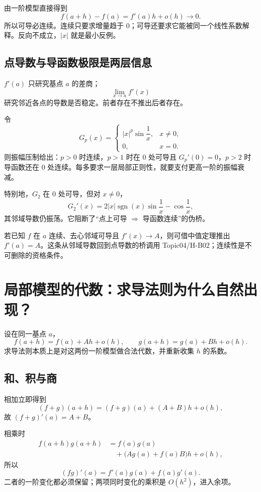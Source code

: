 \documentclass[11pt,a4paper]{ctexart}
\begin{document}
由一阶模型直接得到
\[
f(a+h)-f(a)=f'(a)h+o(h)\to0.
\]
所以可导必连续。连续只要求增量趋于 $0$；可导还要求它能被同一个线性系数解释。反向不成立，$|x|$ 就是最小反例。

\subsection{点导数与导函数极限是两层信息}

$f'(a)$ 只研究基点 $a$ 的差商；
\[
\lim_{x\to a}f'(x)
\]
研究邻近各点的导数是否稳定。前者存在不推出后者存在。

令
\[
G_p(x)=
\begin{cases}
|x|^p\sin\dfrac1x,&x\ne0,\\
0,&x=0.
\end{cases}
\]
则振幅压制给出：$p>0$ 时连续，$p>1$ 时在 $0$ 处可导且 $G_p'(0)=0$，$p>2$ 时导函数还在 $0$ 处连续。每多要求一层局部正则性，就要支付更高一阶的振幅衰减。

特别地，$G_2$ 在 $0$ 处可导，但对 $x\ne0$，
\[
G_2'(x)=2|x|\operatorname{sgn}(x)\sin\frac1x-\cos\frac1x,
\]
其邻域导数仍振荡。它阻断了“点上可导 $\Rightarrow$ 导函数连续”的伪桥。

若已知 $f$ 在 $a$ 连续、去心邻域可导且 $f'(x)\to A$，则可借中值定理推出 $f'(a)=A$。这条从邻域导数回到点导数的桥调用 Topic04/H-B02；连续性是不可删除的资格条件。

\section{局部模型的代数：求导法则为什么自然出现？}

设在同一基点 $a$，
\[
f(a+h)=f(a)+Ah+o(h),
\qquad
g(a+h)=g(a)+Bh+o(h).
\]
求导法则本质上是对这两份一阶模型做合法代数，并重新收集 $h$ 的系数。

\subsection{和、积与商}

相加立即得到
\[
(f+g)(a+h)=(f+g)(a)+(A+B)h+o(h),
\]
故 $(f+g)'(a)=A+B$。

相乘时
\[
\begin{aligned}
f(a+h)g(a+h)
&=f(a)g(a)\\
&\quad+\bigl(A g(a)+f(a)B\bigr)h+o(h),
\end{aligned}
\]
所以
\[
(fg)'(a)=f'(a)g(a)+f(a)g'(a).
\]
二者的一阶变化都必须保留；两项同时变化的乘积是 $O(h^2)$，进入余项。
\end{document}
